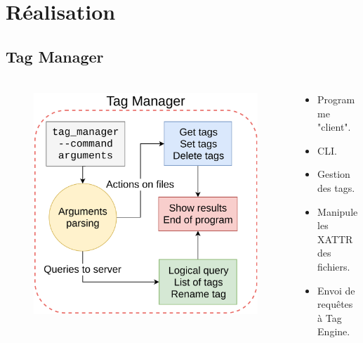 \documentclass[10pt]{beamer}
\begin{document}
\section{Réalisation}
\subsection{Tag Manager}
\begin{frame}
    \frametitle{\subsecname}
    \begin{columns}[T]
        \begin{column}{.5\textwidth}
            \begin{figure}
                \begin{center}
                    \includegraphics[width=1\textwidth]{images/tag_manager2.png}
                \end{center}
            \end{figure}
        \end{column}
        \pause
        \begin{column}{.5\textwidth}
            \begin{itemize}
                \item Programme "client".
                \item CLI.
                \item Gestion des tags.
                \item Manipule les XATTR des fichiers.
                \item Envoi de requêtes à Tag Engine.
            \end{itemize}
        \end{column}
    \end{columns}
\end{frame}
\end{document}
